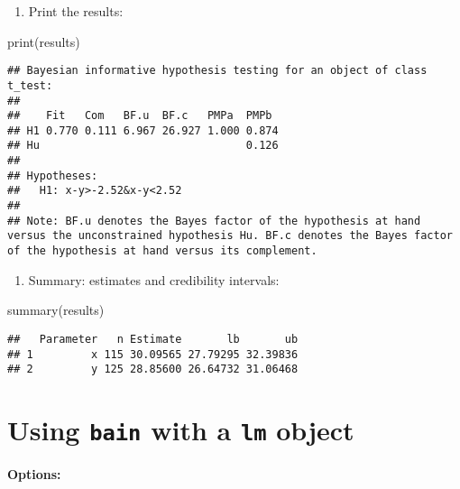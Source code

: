 \documentclass[
]{book}
\newenvironment{Shaded}{\begin{snugshade}}{\end{snugshade}}
\newcommand{\FunctionTok}[1]{\textcolor[rgb]{0.00,0.00,0.00}{#1}}
\newcommand{\NormalTok}[1]{#1}
\providecommand{\tightlist}{%
  \setlength{\itemsep}{0pt}\setlength{\parskip}{0pt}}
\begin{document}
\begin{enumerate}
\def\labelenumi{\arabic{enumi})}
\setcounter{enumi}{2}
\tightlist
\item
  Print the results:
\end{enumerate}

\begin{Shaded}
\begin{Highlighting}[]
\FunctionTok{print}\NormalTok{(results)}
\end{Highlighting}
\end{Shaded}

\begin{verbatim}
## Bayesian informative hypothesis testing for an object of class t_test:
## 
##    Fit   Com   BF.u  BF.c   PMPa  PMPb 
## H1 0.770 0.111 6.967 26.927 1.000 0.874
## Hu                                0.126
## 
## Hypotheses:
##   H1: x-y>-2.52&x-y<2.52
## 
## Note: BF.u denotes the Bayes factor of the hypothesis at hand versus the unconstrained hypothesis Hu. BF.c denotes the Bayes factor of the hypothesis at hand versus its complement.
\end{verbatim}

\begin{enumerate}
\def\labelenumi{\arabic{enumi})}
\setcounter{enumi}{3}
\tightlist
\item
  Summary: estimates and credibility intervals:
\end{enumerate}

\begin{Shaded}
\begin{Highlighting}[]
\FunctionTok{summary}\NormalTok{(results)}
\end{Highlighting}
\end{Shaded}

\begin{verbatim}
##   Parameter   n Estimate       lb       ub
## 1         x 115 30.09565 27.79295 32.39836
## 2         y 125 28.85600 26.64732 31.06468
\end{verbatim}

\hypertarget{using-bain-with-a-lm-object}{%
\section{\texorpdfstring{Using \texttt{bain} with a \texttt{lm} object}{Using bain with a lm object}}\label{using-bain-with-a-lm-object}}

\textbf{Options:}
\end{document}
